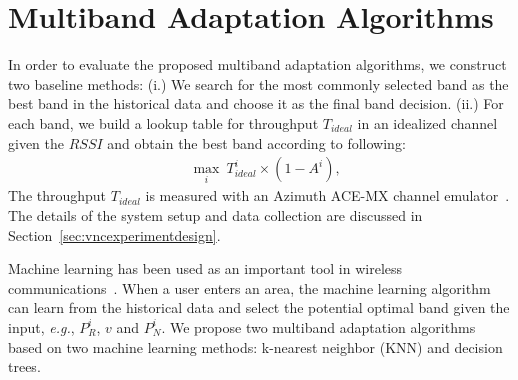 
\section{Multiband Adaptation Algorithms}
\label{subsec:algorithms}

In order to evaluate the proposed multiband adaptation algorithms, we construct two 
baseline methods: (i.) We search for the most commonly selected band as the best band 
in the historical data and choose it as the final band decision. (ii.) For each band, 
we build a lookup table for throughput $T_{ideal}$ in an idealized channel given the 
$RSSI$ and obtain the best band according to following:
\begin{align}
&\max_i\ T_{ideal}^i\times(1-A^i),
\label{eq:baseline2}
\end{align}
The throughput $T_{ideal}$ is measured with an Azimuth ACE-MX channel emulator~\cite{AzimuthACE}. 
The details of the system setup and data collection are discussed in Section~\ref{sec:vncexperimentdesign}. 

Machine learning has been used as an important tool in wireless communications~\cite{haykin2005cognitive}. 
When a user enters an area, the machine
learning algorithm can learn from the historical data and
select the potential optimal band given the input, {\it e.g.}, $P_R^i$, $v$
and $P_N^i$. We propose two multiband adaptation algorithms based on
two machine learning methods: k-nearest neighbor (KNN) and decision trees.

